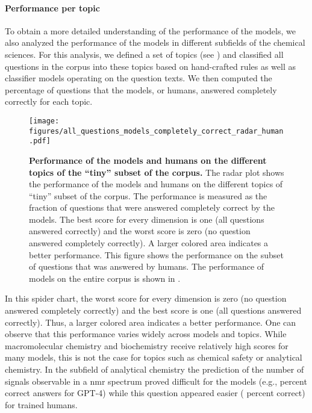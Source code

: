 \documentclass[11pt, oneside]{article}
\begin{document}
\begin{refsection}
\paragraph{Performance per topic} To obtain a more detailed understanding of the performance of the models, we also analyzed the performance of the models in different subfields of the chemical sciences.
For this analysis, we defined a set of topics (see ) and classified all questions in the \chembench corpus into these topics based on hand-crafted rules as well as classifier models operating on the question texts.
We then computed the percentage of questions that the models, or humans, answered completely correctly for each topic.
\begin{figure}[!h]
    \centering
    \texttt{[image: figures/all\_questions\_models\_completely\_correct\_radar\_human.pdf]}
    \caption{\textbf{Performance of the models and humans on the different topics of the \enquote{tiny} subset of the \chembench corpus.} The radar plot shows the performance of the models and humans on the different topics of \enquote{tiny} subset of the \chembench corpus. The performance is measured as the fraction of questions that were answered completely correct by the models.
    The best score for every dimension is one (all questions answered correctly) and the worst score is zero (no question answered completely correctly). A larger colored area indicates a better performance.
    This figure shows the performance on the subset of questions that was answered by humans. The performance of models on the entire corpus is shown in .
    }
    \label{fig:all_questions_models_completely_correct_radar_human}
\end{figure}
In this spider chart, the worst score for every dimension is zero (no question answered completely correctly) and the best score is one (all questions answered correctly). 
Thus, a larger colored area indicates a better performance. 
One can observe that this performance varies widely across models and topics. 
While macromolecular chemistry and biochemistry receive relatively high scores for many models, this is not the case for topics such as chemical safety or analytical chemistry.
In the subfield of analytical chemistry the prediction of the number of signals observable in a \gls{nmr} spectrum proved difficult for the models (e.g.,  percent correct answers for GPT-4) while this question appeared easier ( percent correct) for trained humans.

\end{refsection}
\end{document}
